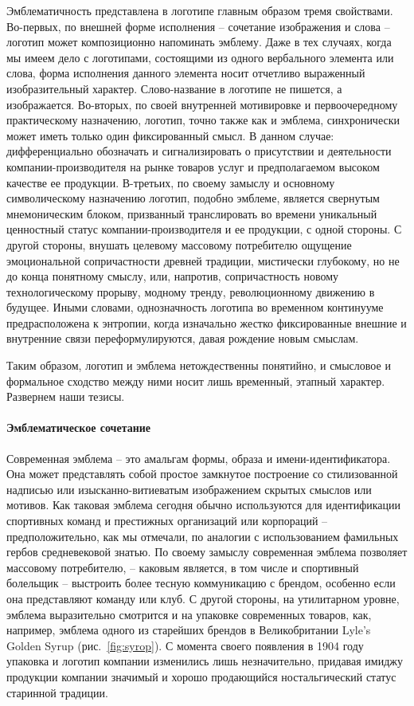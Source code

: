 Эмблематичность представлена в логотипе главным образом тремя свойствами. Во-первых, по внешней
форме исполнения -- сочетание изображения и слова -- логотип может композиционно напоминать
эмблему. Даже в тех случаях, когда мы имеем дело с логотипами, состоящими из одного вербального
элемента или слова, форма исполнения данного элемента носит отчетливо выраженный изобразительный
характер. Слово-название в логотипе не пишется, а изображается. Во-вторых, по своей внутренней
мотивировке и первоочередному практическому назначению, логотип, точно также как и эмблема,
синхронически может иметь только один фиксированный смысл. В данном случае: дифференциально
обозначать и сигнализировать о присутствии и деятельности компании-производителя на рынке товаров
услуг и предполагаемом высоком качестве ее продукции. В-третьих, по своему замыслу и основному
символическому назначению логотип, подобно эмблеме, является свернутым мнемоническим блоком,
призванный транслировать во времени уникальный ценностный статус компании-производителя и ее
продукции, с одной стороны.  С другой стороны, внушать целевому массовому потребителю ощущение
эмоциональной сопричастности древней традиции, мистически глубокому, но не до конца понятному
смыслу, или, напротив, сопричастность новому технологическому прорыву, модному тренду,
революционному движению в будущее.  Иными словами, однозначность логотипа во временном континууме
предрасположена к энтропии, когда изначально жестко фиксированные внешние и внутренние связи
переформулируются, давая рождение новым смыслам.

Таким образом, логотип и эмблема нетождественны понятийно, и смысловое и формальное сходство между
ними носит лишь временный, этапный характер.  Развернем наши тезисы.

\paragraph{Эмблематическое сочетание}
Современная эмблема – это амальгам формы, образа и имени-идентификатора. Она может представлять
собой простое замкнутое построение со стилизованной надписью или изысканно-витиеватым изображением
скрытых смыслов или мотивов. Как таковая эмблема сегодня обычно используются для идентификации
спортивных команд и престижных организаций или корпораций – предположительно, как мы отмечали,  по
аналогии с использованием фамильных гербов средневековой знатью. По своему замыслу современная
эмблема позволяет  массовому потребителю, -- каковым является, в том числе и спортивный болельщик
-- выстроить более тесную коммуникацию с брендом, особенно если она представляют команду или клуб.
С другой стороны, на утилитарном уровне, эмблема выразительно смотрится и на упаковке современных
товаров, как, например, эмблема одного из старейших брендов в Великобритании Lyle’s Golden
Syrup (рис.~\ref{fig:syrop}). С момента своего появления в 1904 году упаковка и логотип компании изменились
лишь незначительно, придавая имиджу продукции компании значимый и хорошо продающийся ностальгический
статус старинной традиции.

